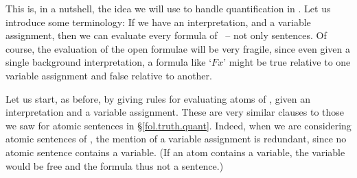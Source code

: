This is, in a nutshell, the idea we will use to handle quantification in \FOL. Let us introduce some terminology:   
If we have an interpretation, and a variable assignment, then we can evaluate every formula of \FOL\ – not only sentences. Of course, the evaluation of the open formulae will be very fragile, since even given a single background interpretation, a formula like `$Fx$' might be true relative to one variable assignment and false relative to another. 

Let us start, as before, by giving rules for evaluating atoms of \FOL, given an interpretation and a variable assignment.  These are very similar clauses to those we saw for atomic sentences in §\ref{fol.truth.quant}. Indeed, when we are considering atomic sentences of \FOL, the mention of a variable assignment is redundant, since no atomic sentence contains a variable. (If an atom contains a variable, the variable would be free and the formula thus not a sentence.)

